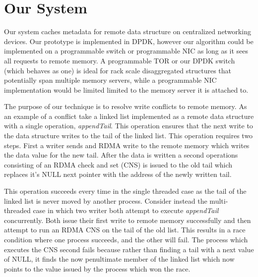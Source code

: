 
\section{Our System}

Our system caches metadata for remote data structure on centralized
networking devices. Our prototype is implemented in DPDK, however our
algorithm could be implemented on a programmable switch or
programmable NIC as long as it sees all requests to remote memory. 
A programmable TOR or our DPDK switch (which behaves as one) is ideal
for rack scale disaggregated structures that potentially span multiple
memory servers, while a programmable NIC implementation would be
limited limited to the memory server it is attached to. 

The purpose of our technique is to resolve write conflicts to remote
memory. As an example of a conflict take a linked list implemented as
a remote data structure with a single operation, \textit{appendTail}.
This operation ensures that the next write to the data structure
writes to the tail of the linked list. This operation requires two
steps.  First a writer sends and RDMA write to the remote memory which
writes the data value for the new tail. After the data is written a
second operations consisting of an RDMA check and set (CNS) is issued
to the old tail which replaces it's NULL next pointer with the address
of the newly written tail.

This operation succeeds every time in the single threaded case as the
tail of the linked list is never moved by another process. Consider
instead the multi-threaded case in which two writer both attempt to
execute \textit{appendTail} concurrently. Both issue their first write
to remote memory successfully and then attempt to run an RDMA CNS on
the tail of the old list. This results in a race condition where one
process succeeds, and the other will fail. The process which executes
the CNS second fails because rather than finding a tail with a next
value of NULL, it finds the now penultimate member of the linked list
which now points to the value issued by the process which won the
race. 

